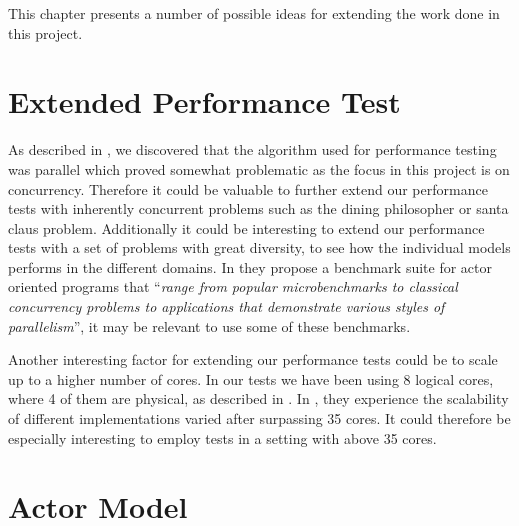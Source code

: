 \makeatletter {}\makeatother
{}
This chapter presents a number of possible ideas for extending the work done in this project.

\section{Extended Performance Test}
\label{sec:extended_performance_test}
As described in , we discovered that the algorithm used for performance testing was parallel which proved somewhat problematic as the focus in this project is on concurrency. Therefore it could be valuable to further extend our performance tests with inherently concurrent problems such as the dining philosopher or santa claus problem. Additionally it could be interesting to extend our performance tests with a set of problems with great diversity, to see how the individual models performs in the different domains. In \cite{imam2014savina} they propose a benchmark suite for actor oriented programs that ``\textit{range from popular microbenchmarks to classical concurrency problems to applications that demonstrate various styles of parallelism}'', it may be relevant to use some of these benchmarks.

Another interesting factor for extending our performance tests could be to scale up to a higher number of cores. In our tests we have been using 8 logical cores, where 4 of them are physical, as described in . In \cite{harris2003language}, they experience the scalability of different implementations varied after surpassing 35 cores. It could therefore be especially interesting to employ tests in a setting with above 35 cores.



\section{Actor Model}

	

\worksheetend
